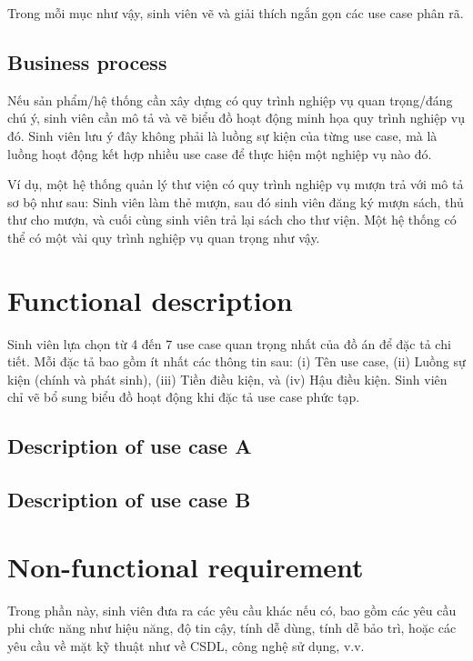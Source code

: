 \documentclass[../Main.tex]{subfiles}
\begin{document}
Trong mỗi mục như vậy, sinh viên vẽ và giải thích ngắn gọn các use case phân rã.

\subsection{Business process}
\label{subsection:2.2.3}
Nếu sản phẩm/hệ thống cần xây dựng có quy trình nghiệp vụ quan trọng/đáng chú ý, sinh viên cần mô tả và vẽ biểu đồ hoạt động minh họa quy trình nghiệp vụ đó.
Sinh viên lưu ý đây không phải là luồng sự kiện của từng use case, mà là luồng hoạt động kết hợp nhiều use case để thực hiện một nghiệp vụ nào đó.

Ví dụ, một hệ thống quản lý thư viện có quy trình nghiệp vụ mượn trả với mô tả sơ bộ như sau: Sinh viên làm thẻ mượn, sau đó sinh viên đăng ký mượn sách, thủ thư cho mượn, và cuối cùng sinh viên trả lại sách cho thư viện.
Một hệ thống có thể có một vài quy trình nghiệp vụ quan trọng như vậy.
\section{Functional description}
\label{section:2.3}
Sinh viên lựa chọn từ 4 đến 7 use case quan trọng nhất của đồ án để đặc tả chi tiết.
Mỗi đặc tả bao gồm ít nhất các thông tin sau: (i) Tên use case, (ii) Luồng sự kiện (chính và phát sinh), (iii) Tiền điều kiện, và (iv) Hậu điều kiện.
Sinh viên chỉ vẽ bổ sung biểu đồ hoạt động khi đặc tả use case phức tạp.
\subsection{Description of use case A}
\hfill
\subsection{Description of use case B}
\hfill

\section{Non-functional requirement}
\label{section:2.4}
Trong phần này, sinh viên đưa ra các yêu cầu khác nếu có, bao gồm các yêu cầu phi chức năng như hiệu năng, độ tin cậy, tính dễ dùng, tính dễ bảo trì, hoặc các yêu cầu về mặt kỹ thuật như về CSDL, công nghệ sử dụng, v.v.

\end{document}
